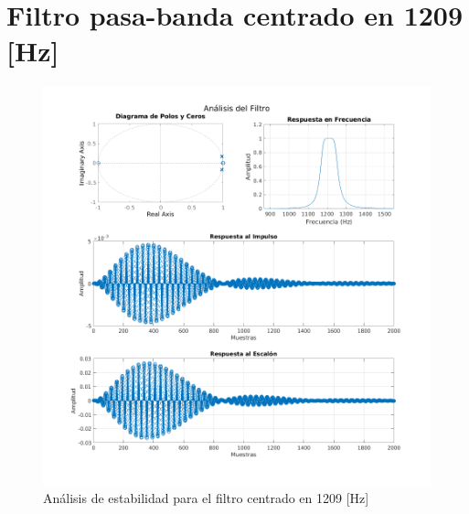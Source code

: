 \section{Filtro pasa-banda centrado en 1209 [Hz]}
\begin{figure}[H]
  \centering
  \includegraphics[width=\linewidth]{images/simulacion/1209.png}
  \caption{Análisis de estabilidad para el filtro centrado en 1209 [Hz]}
  \label{fig:analisis_1209}
\end{figure}

